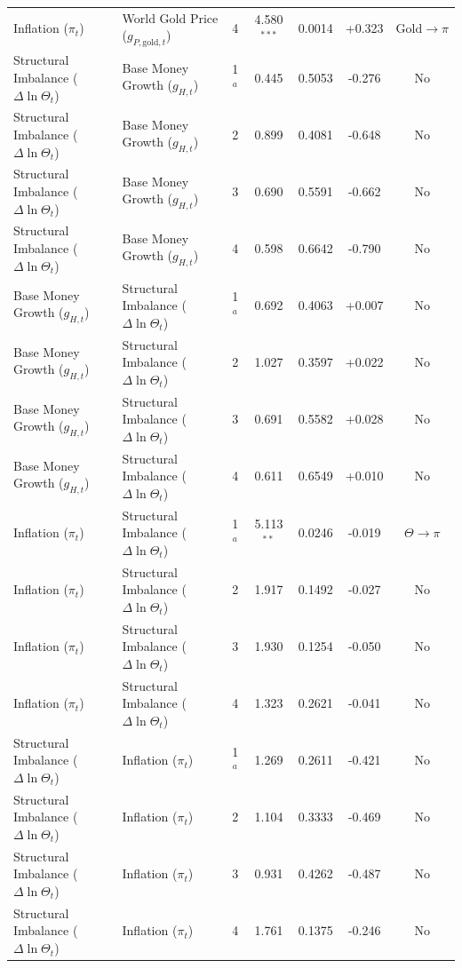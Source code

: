 \begin{table}[p]
{\begin{tabular}{llccccc}
Inflation ($\pi_t$) & World Gold Price ($g_{P,\text{gold},t}$) & 4 & 4.580$^{***}$ & 0.0014 & +0.323 & $\text{Gold} \to \pi$ \\
Structural Imbalance ($\Delta \ln \Theta_t$) & Base Money Growth ($g_{H,t}$) & 1$^a$ & 0.445 & 0.5053 & -0.276 & No \\
Structural Imbalance ($\Delta \ln \Theta_t$) & Base Money Growth ($g_{H,t}$) & 2 & 0.899 & 0.4081 & -0.648 & No \\
Structural Imbalance ($\Delta \ln \Theta_t$) & Base Money Growth ($g_{H,t}$) & 3 & 0.690 & 0.5591 & -0.662 & No \\
Structural Imbalance ($\Delta \ln \Theta_t$) & Base Money Growth ($g_{H,t}$) & 4 & 0.598 & 0.6642 & -0.790 & No \\
Base Money Growth ($g_{H,t}$) & Structural Imbalance ($\Delta \ln \Theta_t$) & 1$^a$ & 0.692 & 0.4063 & +0.007 & No \\
Base Money Growth ($g_{H,t}$) & Structural Imbalance ($\Delta \ln \Theta_t$) & 2 & 1.027 & 0.3597 & +0.022 & No \\
Base Money Growth ($g_{H,t}$) & Structural Imbalance ($\Delta \ln \Theta_t$) & 3 & 0.691 & 0.5582 & +0.028 & No \\
Base Money Growth ($g_{H,t}$) & Structural Imbalance ($\Delta \ln \Theta_t$) & 4 & 0.611 & 0.6549 & +0.010 & No \\
Inflation ($\pi_t$) & Structural Imbalance ($\Delta \ln \Theta_t$) & 1$^a$ & 5.113$^{**}$ & 0.0246 & -0.019 & $\Theta \to \pi$ \\
Inflation ($\pi_t$) & Structural Imbalance ($\Delta \ln \Theta_t$) & 2 & 1.917 & 0.1492 & -0.027 & No \\
Inflation ($\pi_t$) & Structural Imbalance ($\Delta \ln \Theta_t$) & 3 & 1.930 & 0.1254 & -0.050 & No \\
Inflation ($\pi_t$) & Structural Imbalance ($\Delta \ln \Theta_t$) & 4 & 1.323 & 0.2621 & -0.041 & No \\
Structural Imbalance ($\Delta \ln \Theta_t$) & Inflation ($\pi_t$) & 1$^a$ & 1.269 & 0.2611 & -0.421 & No \\
Structural Imbalance ($\Delta \ln \Theta_t$) & Inflation ($\pi_t$) & 2 & 1.104 & 0.3333 & -0.469 & No \\
Structural Imbalance ($\Delta \ln \Theta_t$) & Inflation ($\pi_t$) & 3 & 0.931 & 0.4262 & -0.487 & No \\
Structural Imbalance ($\Delta \ln \Theta_t$) & Inflation ($\pi_t$) & 4 & 1.761 & 0.1375 & -0.246 & No \\

\end{tabular}}
\end{table}
